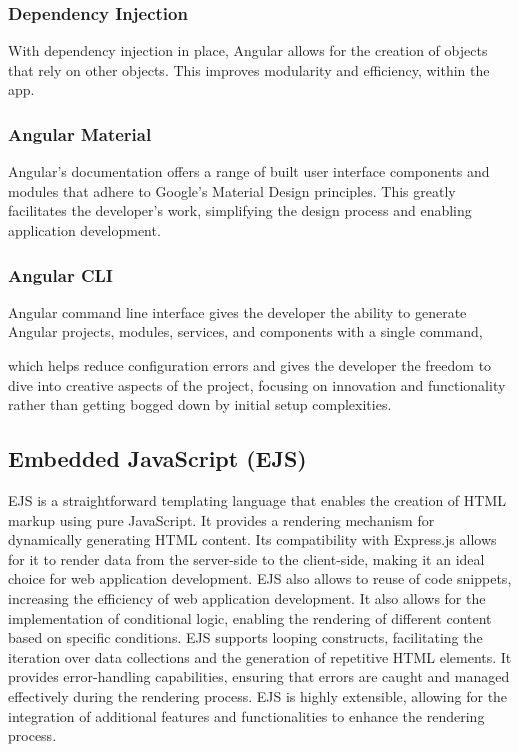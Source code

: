 \subsubsection{Dependency Injection}
With dependency injection in place, Angular allows for the creation of objects that rely on other objects. This improves modularity and efficiency, within the app.

\subsubsection{Angular Material}
Angular's documentation offers a range of built user interface components and modules that adhere to Google's Material Design principles. This greatly facilitates the developer's work, simplifying the design process and enabling application development.

\subsubsection{Angular CLI} Angular command line interface gives the developer the ability to generate Angular projects, modules, services, and components with a single command, 

which helps reduce configuration errors and gives the developer the freedom to dive into creative aspects of the project, focusing on innovation and functionality rather than getting bogged down by initial setup complexities.

\subsection{Embedded JavaScript (EJS)}
EJS is a straightforward templating language that enables the creation of HTML markup using pure JavaScript. It provides a rendering mechanism for dynamically generating HTML content.\cite{ejs}
Its compatibility with Express.js allows for it to render data from the server-side to the client-side, making it an ideal choice for web application development. 
EJS also allows to reuse of code snippets, increasing the efficiency of web application development. 
It also allows for the implementation of conditional logic, enabling the rendering of different content based on specific conditions. EJS supports looping constructs, facilitating the iteration over data collections 
and the generation of repetitive HTML elements. It provides error-handling capabilities, ensuring that errors are caught and managed effectively during the rendering process. EJS is highly extensible,
allowing for the integration of additional features and functionalities to enhance the rendering process. \cite{ejs}

